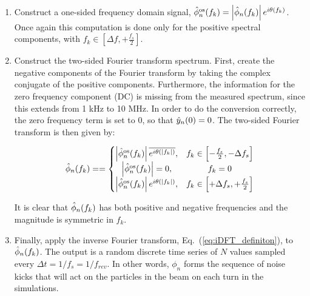 \begin{enumerate}
    \item Construct a one-sided frequency domain signal, $\hat{\phi}_n^\mathrm{os}(f_k) =\left| \hat{\phi}_n(f_k) \right| e^{{i} \theta(f_k)}$.  Once again this computation is done only for the positive spectral components, with $f_k \in \left[\Delta f,+\frac{f_s}{2} \right ]$.
    \item Construct the two-sided Fourier transform spectrum. First, create the negative components of the Fourier transform by taking the complex conjugate of the positive components. Furthermore, the information for the zero frequency component (DC) is missing from the measured spectrum, since this extends from  1 kHz to 10 MHz. In order to do the conversion correctly, the zero frequency term is set to 0, so that $\hat{y}_n(0)=0$. The two-sided Fourier transform is then given by:
    

    \begin{equation}
        \hat{\phi}_n(f_k) = = \left\{\begin{matrix}
   \left | \hat{\phi}_n^\mathrm{os}(f_k) \right | \overline{e^{{i}\theta (\mid f_k \mid)}}, & f_k \in \left [-\frac{f_s}{2}, -\Delta f_s \right] \\ 
    \left | \hat{\phi}_n^\mathrm{os}(f_k) \right | = 0, & f_k=0  \\
   \left | \hat{\phi}_n^\mathrm{os}(f_k) \right | e^{{i}\theta (\mid f_k \mid)}, & f_k \in \left [+ \Delta f_s, + \frac{f_s}{2} \right]  
    \end{matrix}\right.
    \end{equation}

    It is clear that $\hat{\phi}_n(f_k)$ has both positive and negative frequencies and the magnitude is symmetric in $f_k$.
    
    \item Finally, apply the inverse Fourier transform, Eq.~(\ref{eq:iDFT_definiton}), to $\hat{\phi}_n(f_k)$. The  output  is  a  random  discrete  time  series of $N$ values sampled every $\Delta t = 1/f_s=1/f_{rev}$. In other words, $\phi_n$ forms the sequence of noise kicks that will act on the particles in the beam on each turn in the simulations.

\end{enumerate} 

